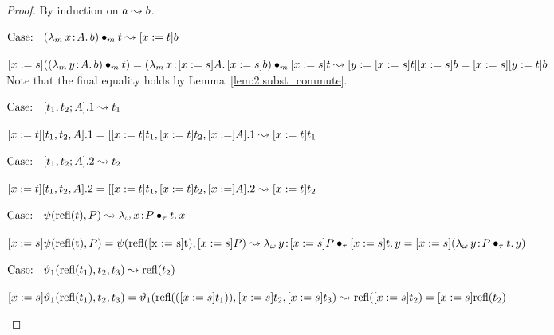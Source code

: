 \begin{proof}
    By induction on $a \leadsto b$.

    $\text{Case: }\begin{array}{c} ({\lambda_m}\, x\! : \! A.\, b) \bullet_{m} t \leadsto [x := t]b \end{array}$
    \begin{proofcase}
        $[x := s](({\lambda_m}\, y\! : \! A.\, b) \bullet_{m} t) = ({\lambda_m}\, x\! : \! [x := s]A.\, [x := s]b) \bullet_{m} [x := s]t \leadsto [y := [x := s]t][x := s]b = [x := s][y := t]b$ \\
        Note that the final equality holds by Lemma~\ref{lem:2:subst_commute}.
    \end{proofcase}

    $\text{Case: }\begin{array}{c} [t_1, t_2; A].1 \leadsto t_1 \end{array}$
    \begin{proofcase}
        $[x := t][t_1, t_2, A].1 = [[x := t]t_1, [x := t]t_2, [x := ]A].1 \leadsto [x := t]t_1$
    \end{proofcase}

    $\text{Case: }\begin{array}{c} [t_1, t_2; A].2 \leadsto t_2 \end{array}$
    \begin{proofcase}
        $[x := t][t_1, t_2, A].2 = [[x := t]t_1, [x := t]t_2, [x := ]A].2 \leadsto [x := t]t_2$
    \end{proofcase}

    $\text{Case: }\begin{array}{c} \psi(\text{refl}(t),P) \leadsto {\lambda_\omega}\, x\! : \! P \bullet_{\tau} t.\, x \end{array}$
    \begin{proofcase}
        $[x := s]\psi(\text{refl(t)}, P) = \psi(\text{refl([x := s]t)}, [x := s]P) \leadsto {\lambda_\omega}\, y\! : \! [x := s]P \bullet_{\tau} [x := s]t.\, y = [x := s]({\lambda_\omega}\, y\! : \! P \bullet_{\tau} t.\, y)$
    \end{proofcase}

    $\text{Case: }\begin{array}{c} \vartheta_1(\text{refl}(t_1), t_2, t_3) \leadsto \text{refl}(t_2) \end{array}$
    \begin{proofcase}
        $[x := s]\vartheta_1(\text{refl}(t_1), t_2, t_3) = \vartheta_1(\text{refl}(([x := s]t_1)), [x := s]t_2, [x := s]t_3) \leadsto \text{refl}([x := s]t_2) = [x := s]\text{refl}(t_2)$
    \end{proofcase}


\end{proof}
